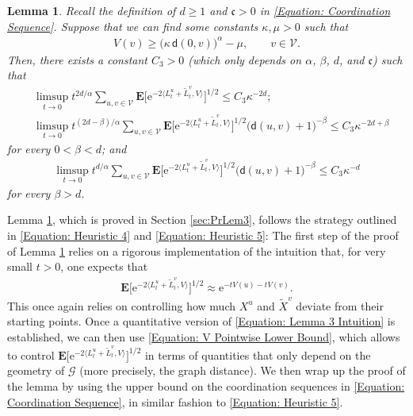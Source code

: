 \documentclass{amsart}
\numberwithin{equation}{section}
\newtheorem{lemma}[theorem]{Lemma}
\theoremstyle{definition}
\newcommand\al{\alpha}
\newcommand\be{\beta}
\newcommand\ka{\kappa}
\newcommand\mbf{\mathbf}
\newcommand\mf{\mathfrak}
\newcommand\mr{\mathrm}
\newcommand\ms{\mathscr}
\newcommand\msf{\mathsf}
\begin{document}
\begin{lemma}
\label{Lemma: Variance Upper Bound 3}
Recall the definition of $d\geq1$ and $\mf c>0$ in \eqref{Equation: Coordination Sequence}.
Suppose that we can find some constants $\ka,\mu>0$ such that
\begin{align}
\label{Equation: V Pointwise Lower Bound}
V(v)\geq\big(\ka\,\msf d(0,v)\big)^\al-\mu,\qquad v\in\ms V.
\end{align}
Then, there exists a constant $C_3>0$
(which only depends on $\al$, $\be$, $d$, and $\mf c$)
such that
\begin{align}
\label{Equation: Variance Upper Bound 3.1}
&\limsup_{t\to0}t^{2d/\al}\sum_{u,v\in\ms V}
\mbf E\Big[\mr e^{-2\langle L^u_t+\tilde L^v_t,V\rangle}\Big]^{1/2}
\leq C_3\ka^{-2d};\\
\label{Equation: Variance Upper Bound 3.2}
&\limsup_{t\to0}t^{(2d-\be)/\al}\sum_{u,v\in\ms V}
\mbf E\Big[\mr e^{-2\langle L^u_t+\tilde L^v_t,V\rangle}\Big]^{1/2}\big(\msf d(u,v)+1\big)^{-\be}
\leq C_3\ka^{-2d+\be}
\end{align}
for every $0<\be<d$; and
\begin{align}
\label{Equation: Variance Upper Bound 3.3}
\limsup_{t\to0}t^{d/\al}\sum_{u,v\in\ms V}
\mbf E\Big[\mr e^{-2\langle L^u_t+\tilde L^v_t,V\rangle}\Big]^{1/2}\big(\msf d(u,v)+1\big)^{-\be}
\leq C_3\ka^{-d}
\end{align}
for every $\be>d$.
\end{lemma}

%

Lemma \ref{Lemma: Variance Upper Bound 3}, which is proved in Section \ref{sec:PrLem3},
follows the strategy outlined in \eqref{Equation: Heuristic 4} and \eqref{Equation: Heuristic 5}:
The first step of the proof of Lemma \ref{Lemma: Variance Upper Bound 3} relies on a rigorous
implementation of the intuition that, for very small $t>0$, one expects that
\begin{align}
\label{Equation: Lemma 3 Intuition}
\mbf E\big[\mr e^{-2\langle L^u_t+\tilde L^v_t,V\rangle}\big]^{1/2}\approx\mr e^{-tV(u)-tV(v)}.
\end{align}
This once again relies on controlling how much  $X^u$ and $\tilde X^v$ deviate from their starting points.
Once a quantitative version of \eqref{Equation: Lemma 3 Intuition} is established, 
we can then use \eqref{Equation: V Pointwise Lower Bound}, which allows to control
$\mbf E\big[\mr e^{-2\langle L^u_t+\tilde L^v_t,V\rangle}\big]^{1/2}$
in terms of quantities that only depend on the geometry of $\ms G$ (more precisely, the graph distance).
We then wrap up the proof of the lemma by using the upper bound on the coordination sequences in
\eqref{Equation: Coordination Sequence}, in similar fashion to \eqref{Equation: Heuristic 5}.
\end{document}
